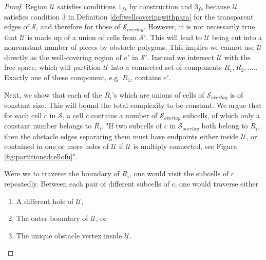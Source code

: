\begin{proof}
Region $\mathcal{U}$ satisfies conditions $1_{fs}$ by construction and $3_{fs}$ because 
$\mathcal{U}$ satisfies condition 3 in Definition \ref{def:wellcoveringwithpara} for 
the transparent edges of $\mathcal{S}$, and therefore for those of $\mathcal{S}_{overlay}$. 
However, it is not necessarily true that $\mathcal{U}$ is made up of a union of cells from 
$\mathcal{S}'$. This will lead to $\mathcal{U}$ being cut into a nonconstant number of pieces 
by obstacle polygons. This implies we cannot use $\mathcal{U}$ directly as the well-covering 
region of $e'$ in $\mathcal{S}'$. Instead we intersect $\mathcal{U}$ with the free space, which 
will partition $\mathcal{U}$ into a connected set of components $R_1,R_2,....$. Exactly one of 
these component, e.g. $R_1$, contains $e'$. 

Next, we show that each of the $R_i$'s which are unions of cells of $\mathcal{S}_{overlay}$ is of 
constant size. This will bound the total complexity to be constant. We argue that for each cell 
$c$ in $\mathcal{S}$, a cell $c$ contains a number of $\mathcal{S}_{overlay}$ subcells, of 
which only a constant number belongs to $R_i$. "If two subcells of $c$ in $\mathcal{S}_{overlay}$
both belong to $R_i$, then the obstacle edges separating them must have endpoints either inside 
$\mathcal{U}$, or contained in one or more holes of $\mathcal{U}$ if $\mathcal{U}$ is multiply 
connected, see Figure \ref{fig:partitionedcellofu}".


Were we to traverse the boundary of $R_i$, one would visit the subcells of $c$ repeatedly. 
Between each pair of different subcells of $c$, one would traverse either

\begin{enumerate}
\item A different hole of $\mathcal{U}$,
\item The outer boundary of $\mathcal{U}$, or
\item The unique obstacle vertex inside $\mathcal{U}$.
\end{enumerate}


\end{proof}
